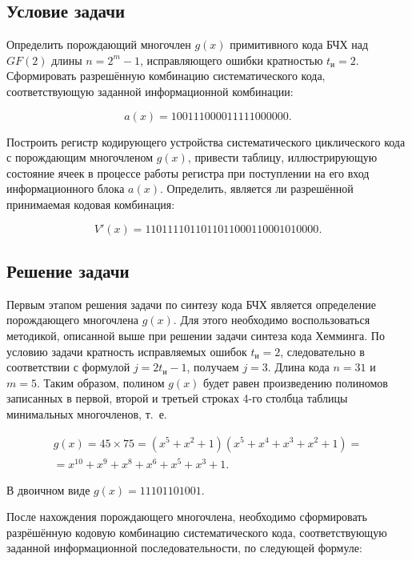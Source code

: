 \subsection{Условие задачи}

Определить порождающий многочлен $g(x)$ примитивного кода БЧХ над
$GF(2)$ длины $n = 2^m -1$, исправляющего ошибки кратностью
$t_{\text{и}} = 2$. Сформировать разрешённую комбинацию систематического
кода, соответствующую заданной информационной комбинации:

\begin{equation*}
a(x) = 100111000011111000000.
\end{equation*}

Построить регистр кодирующего устройства систематического циклического
кода с порождающим многочленом $g(x)$, привести таблицу,
иллюстрирующую состояние ячеек в процессе работы регистра при
поступлении на его вход информационного блока $a(x)$. Определить,
является ли разрешённой принимаемая кодовая комбинация:

\begin{equation*}
V'(x) = 1101111011011011000110001010000.
\end{equation*}


\subsection{Решение задачи}

Первым этапом решения задачи по синтезу кода БЧХ является определение
порождающего многочлена $g(x)$. Для этого необходимо воспользоваться
методикой, описанной выше при решении задачи синтеза кода Хемминга. По
условию задачи кратность исправляемых ошибок $t_{\text{и}} = 2$,
следовательно в соответствии с формулой $j = 2t_{\text{и}} - 1$,
получаем $j = 3$. Длина кода $n = 31$ и $m =5$. Таким образом, полином
$g(x)$ будет равен произведению полиномов записанных в первой, второй
и третьей строках 4-го столбца таблицы минимальных многочленов, т.~е.

\begin{gather*}
  g(x) = 45 \times 75 = (x^5 + x^2 + 1)(x^5 + x^4 + x^3 + x^2 + 1) = \\
  = x^{10} + x^9 + x^8 + x^6 + x^5 + x^3 + 1.
\end{gather*}

В двоичном виде $g(x) = 11101101001$.

После нахождения порождающего многочлена, необходимо сформировать
разрёшённую кодовую комбинацию систематического кода, соответствующую
заданной информационной последовательности, по следующей формуле:

